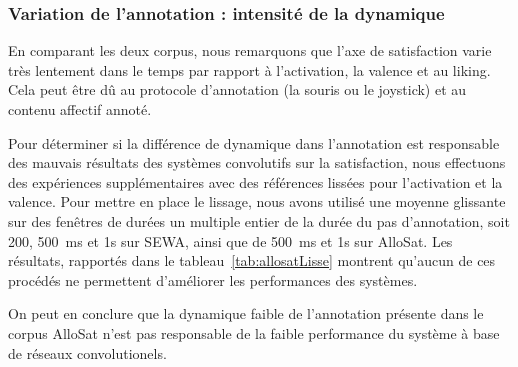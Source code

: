 \subsubsection{Variation de l'annotation : intensité de la dynamique}
En comparant les deux corpus, nous remarquons que l'axe de satisfaction varie très lentement dans le temps par rapport à l'activation, la valence et au liking. Cela peut être dû au protocole d'annotation (la souris ou le joystick) et au contenu affectif annoté.

%
Pour déterminer si la différence de dynamique dans l'annotation est responsable des mauvais résultats des systèmes convolutifs sur la satisfaction, nous effectuons des expériences supplémentaires avec des références lissées pour l'activation et la valence. Pour mettre en place le lissage, nous avons utilisé une moyenne glissante sur des fenêtres de durées un multiple entier de la durée du pas d'annotation, soit 200, 500~ms et 1s sur SEWA, ainsi que de 500~ms et 1s sur AlloSat. Les résultats, rapportés dans le tableau~\ref{tab:allosatLisse} montrent qu'aucun de ces procédés ne permettent d'améliorer les performances des systèmes.



On peut en conclure que la dynamique faible de l'annotation présente dans le corpus AlloSat n'est pas responsable de la faible performance du système à base de réseaux convolutionels.

